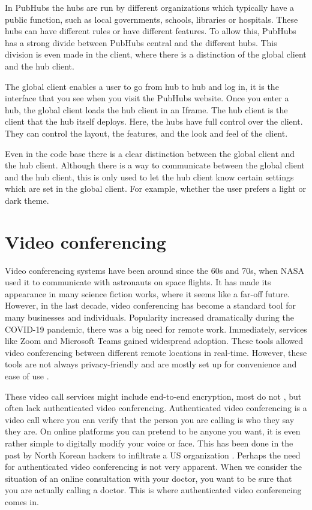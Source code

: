\documentclass{report}
\begin{document}
In PubHubs the hubs are run by different organizations which typically have a public function, such as
local governments, schools, libraries or hospitals.
These hubs can have different rules or have different features.
To allow this, PubHubs has a strong divide between PubHubs central and the different hubs.
This division is even made in the client, where there is a distinction of the global client and the hub client.

The global client enables a user to go from hub to hub and log in, it is
the interface that you see when you visit the PubHubs website.
Once you enter a hub, the global client loads the hub client in an Iframe. The hub client
is the client that the hub itself deploys. Here, the hubs have full control
over the client. They can control the layout, the features, and the look and feel of the client.

Even in the code base there is a clear distinction between the global client and the hub client.
Although there is a way to communicate between the global client and the hub client, this
is only used to let the hub client know certain settings which are set in the global client.
For example, whether the user prefers a light or dark theme.


\section{Video conferencing}
Video conferencing systems have been around since the 60s and 70s, when NASA used it to communicate with astronauts
on space flights. It has made its appearance in many science fiction works, where it seems like a far-off future.
However, in the last decade, video conferencing has become a standard tool for many businesses and individuals.
Popularity increased dramatically during the COVID-19 pandemic, there was a big need for remote work. Immediately,
services like Zoom \cite{noauthor_one_nodate} and Microsoft Teams  \cite{noauthor_microsoft_nodate} gained
widespread adoption. These tools allowed video conferencing between different remote locations in real-time.
However, these tools are not always privacy-friendly and are mostly set up for convenience and ease of use \cite{gauthier_dynamic_2021}.

These video call services might include end-to-end encryption, most do not \cite{gauthier_dynamic_2021}, but often lack authenticated video
conferencing. Authenticated video conferencing is a video call where you can verify that the person you are calling is who they say they are.
On online platforms you can pretend to be anyone you want, it is even rather simple to digitally
modify your voice or face. This has been done in the past by North Korean hackers to infiltrate a US organization \cite{
noauthor_how_nodate}. Perhaps the need for authenticated video conferencing is not very apparent. When we consider
the situation of an online consultation with your doctor, you want to be sure that you are actually calling a doctor. This is
where authenticated video conferencing comes in.
\end{document}
